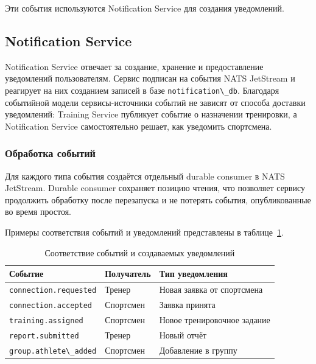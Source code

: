 Эти события используются Notification Service для создания уведомлений.

\subsection{Notification Service}

Notification Service отвечает за создание, хранение и предоставление уведомлений пользователям. Сервис подписан на события NATS JetStream и реагирует на них созданием записей в базе \passthrough{\lstinline!notification\_db!}. Благодаря событийной модели сервисы-источники событий не зависят от способа доставки уведомлений: Training Service публикует событие о назначении тренировки, а Notification Service самостоятельно решает, как уведомить спортсмена.

\subsubsection{Обработка событий}

Для каждого типа события создаётся отдельный durable consumer в NATS JetStream. Durable consumer сохраняет позицию чтения, что позволяет сервису продолжить обработку после перезапуска и не потерять события, опубликованные во время простоя.

Примеры соответствия событий и уведомлений представлены в таблице~\ref{tab:event-notification-map}.

\begin{longtable}{|>{\raggedright\arraybackslash}p{}|>{\raggedright\arraybackslash}p{}|>{\raggedright\arraybackslash}p{}|}
\caption{Соответствие событий и создаваемых уведомлений}\label{tab:event-notification-map}\\
\hline
Событие & Получатель & Тип уведомления \\
\hline
\endhead
\hline
\endlastfoot
\passthrough{\lstinline!connection.requested!} & Тренер & Новая заявка от спортсмена \\ \hline
\passthrough{\lstinline!connection.accepted!} & Спортсмен & Заявка принята \\ \hline
\passthrough{\lstinline!training.assigned!} & Спортсмен & Новое тренировочное задание \\ \hline
\passthrough{\lstinline!report.submitted!} & Тренер & Новый отчёт \\ \hline
\passthrough{\lstinline!group.athlete\_added!} & Спортсмен & Добавление в группу \\ \hline
\end{longtable}

